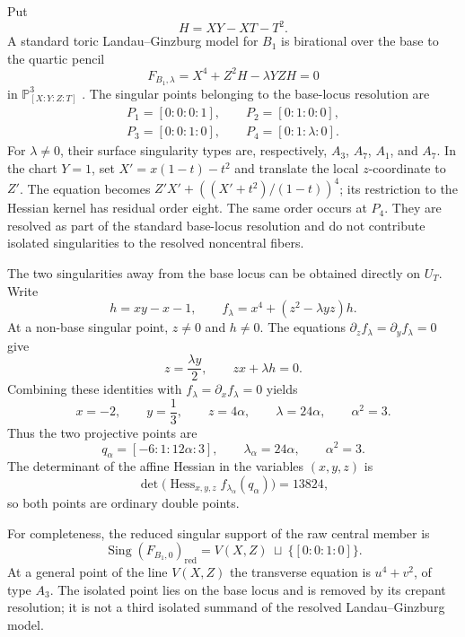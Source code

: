 \documentclass[11pt]{amsart}
\theoremstyle{definition}
\theoremstyle{remark}
\DeclareMathOperator{\Sing}{Sing}
\begin{document}
Put
\[
H=XY-XT-T^2.
\]
A standard toric Landau--Ginzburg model for $B_1$ is birational over the base
to the quartic pencil
\begin{equation}
\label{eq:B1_compact_pencil}
F_{B_1,\lambda}
=X^4+Z^2H-\lambda YZH=0
\end{equation}
in $\mathbb P^3_{[X:Y:Z:T]}$
\cite{PrzyjalkowskiWeak,Przyjalkowski2026}.  The singular points belonging
to the base-locus resolution are
\[
\begin{gathered}
P_1=[0:0:0:1],\qquad P_2=[0:1:0:0],\\
P_3=[0:0:1:0],\qquad P_4=[0:1:\lambda:0].
\end{gathered}
\]
For $\lambda\neq0$, their surface singularity types are, respectively,
$A_3$, $A_7$, $A_1$, and $A_7$.  In the chart $Y=1$, set
$X'=x(1-t)-t^2$ and translate the local $z$-coordinate to $Z'$.  The
equation becomes
$Z'X'+((X'+t^2)/(1-t))^4$; its restriction to the Hessian kernel has
residual order eight.  The same order occurs at $P_4$.  They are resolved as part of the standard
base-locus resolution and do not contribute isolated singularities to the
resolved noncentral fibers.

The two singularities away from the base locus can be obtained directly on
$U_T$.  Write
\[
h=xy-x-1,
\qquad
f_\lambda=x^4+(z^2-\lambda yz)h.
\]
At a non-base singular point, $z\neq0$ and $h\neq0$.  The equations
$\partial_zf_\lambda=\partial_yf_\lambda=0$ give
\[
z=\frac{\lambda y}{2},
\qquad
zx+\lambda h=0.
\]
Combining these identities with $f_\lambda=\partial_xf_\lambda=0$ yields
\[
x=-2,\qquad y=\frac13,\qquad z=4\alpha,\qquad
\lambda=24\alpha,\qquad \alpha^2=3.
\]
Thus the two projective points are
\begin{equation}
\label{eq:B1_compact_nodes}
q_\alpha=[-6:1:12\alpha:3],
\qquad
\lambda_\alpha=24\alpha,
\qquad
\alpha^2=3.
\end{equation}
The determinant of the affine Hessian in the variables $(x,y,z)$ is
\begin{equation}
\label{eq:B1_compact_hessian}
\det\bigl(\operatorname{Hess}_{x,y,z}f_{\lambda_\alpha}
(q_\alpha)\bigr)=13824,
\end{equation}
so both points are ordinary double points.

For completeness, the reduced singular support of the raw central member is
\begin{equation}
\label{eq:B1_raw_central_support}
\Sing(F_{B_1,0})_{\mathrm{red}}
=V(X,Z)\ \sqcup\ \{[0:0:1:0]\}.
\end{equation}
At a general point of the line $V(X,Z)$ the transverse equation is
$u^4+v^2$, of type $A_3$.  The isolated point lies on the base locus and is
removed by its crepant resolution; it is not a third isolated summand of the
resolved Landau--Ginzburg model.
\end{document}
